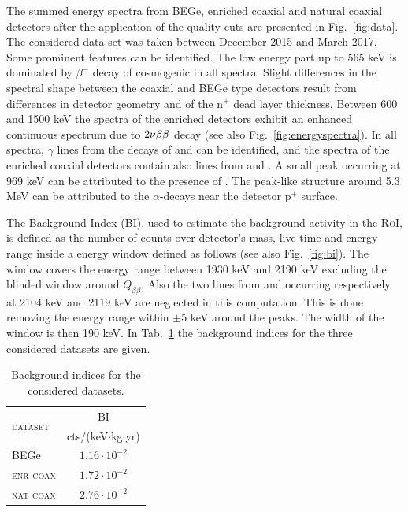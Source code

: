  The summed energy spectra from BEGe, enriched coaxial and natural coaxial detectors after the application of the quality cuts are presented in Fig.~\ref{fig:data}. The considered data set was taken between December 2015 and March 2017. Some prominent features can be identified. The low energy part up to 565 keV is dominated by $\beta^-$ decay of cosmogenic  in all spectra. Slight differences in the spectral shape between the coaxial and BEGe type detectors result from differences in detector geometry and of the n$^+$ dead layer thickness. Between 600 and 1500 keV the spectra of the enriched detectors exhibit an enhanced continuous spectrum due to $2\nu\beta\beta$ decay (see also Fig.~\ref{fig:energyspectra}). In all spectra, $\gamma$ lines from the decays of  and  can be identified, and the spectra of the enriched coaxial detectors contain also lines from  and . A small peak occurring at 969 keV can be attributed to the presence of . The peak-like structure around 5.3 MeV can be attributed to the $\alpha$-decays near the detector p$^+$ surface.

 The Background Index (BI), used to estimate the background activity in the \textsc{RoI}, is defined as the number of counts over detector's mass, live time and energy range inside a energy window defined as follows (see also Fig.~\ref{fig:bi}). The window covers the energy range between 1930 keV and 2190 keV excluding the blinded window around $Q_{\beta\beta}$. Also the two lines from  and  occurring respectively at 2104 keV and 2119 keV are neglected in this computation. This is done removing the energy range within $\pm$5 keV around the peaks. The width of the window is then 190 keV. In Tab.~\ref{tab:bindex} the background indices for the three considered datasets are given.
\begin{table}[b]
	\centering
	\caption{Background indices for the considered datasets.}
	\label{tab:bindex}
	\begin{tabular}{lc}
		\toprule
		\multirow{2}{*}{\textsc{dataset}}	&	BI \\
											&	cts/(keV$\cdot$kg$\cdot$yr) \\
		\midrule
		BEGe								&	$1.16\cdot10^{-2}$	\\
		\textsc{enr coax}					&	$1.72\cdot10^{-2}$	\\
		\textsc{nat coax}					&	$2.76\cdot10^{-2}$	\\
		\bottomrule
	\end{tabular}
\end{table}

